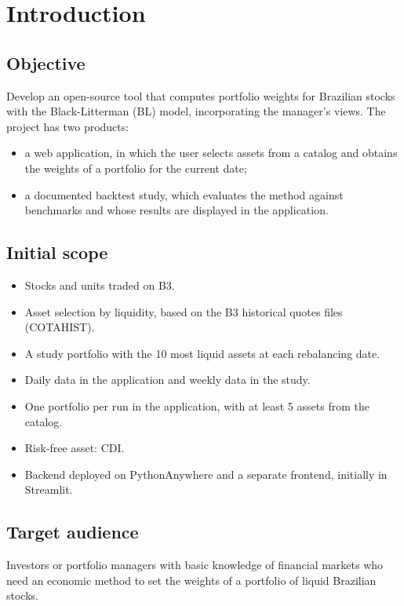 \chapter{Introduction}

\section{Objective}
Develop an open-source tool that computes portfolio weights for Brazilian stocks with the
Black-Litterman (BL) model, incorporating the manager's views. The project has two products:
\begin{itemize}
  \item a web application, in which the user selects assets from a catalog and obtains the weights
        of a portfolio for the current date;
  \item a documented backtest study, which evaluates the method against benchmarks and whose
        results are displayed in the application.
\end{itemize}

\section{Initial scope}
\begin{itemize}
  \item Stocks and units traded on B3.
  \item Asset selection by liquidity, based on the B3 historical quotes files (COTAHIST).
  \item A study portfolio with the 10 most liquid assets at each rebalancing date.
  \item Daily data in the application and weekly data in the study.
  \item One portfolio per run in the application, with at least 5 assets from the catalog.
  \item Risk-free asset: CDI.
  \item Backend deployed on PythonAnywhere and a separate frontend, initially in Streamlit.
\end{itemize}

\section{Target audience}
Investors or portfolio managers with basic knowledge of financial markets who need an economic
method to set the weights of a portfolio of liquid Brazilian stocks.

